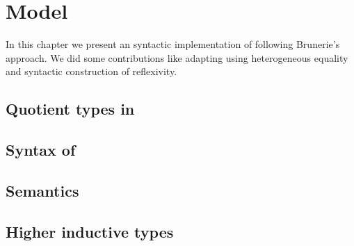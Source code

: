 \chapter{\og Model}



In this chapter we present an syntactic implementation of \wog{} following
Brunerie's approach. We did some contributions like adapting using
heterogeneous equality and syntactic construction of reflexivity.




\section{Quotient types in \hott}


\section{Syntax of \wog}


\section{Semantics}



\section{Higher inductive types}